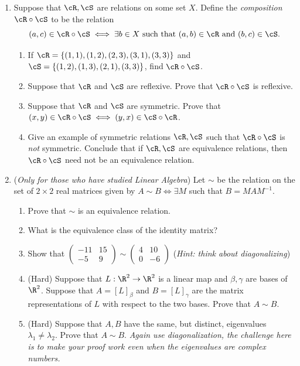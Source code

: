 \begin{enumerate}
	\item Suppose that $\cR,\cS$ are relations on some set $X$. Define the \emph{composition} $\cR\circ \cS$ to be the relation
	\[(a,c)\in \cR\circ \cS\iff \exists b\in X\text{ such that }(a,b)\in \cR\text{ and }(b,c)\in \cS.\]
	\begin{enumerate}
		\item If $\cR=\{(1,1),(1,2),(2,3),(3,1),(3,3)\}$ and $\cS=\{(1,2),(1,3),(2,1),(3,3)\}$, find $\cR\circ \cS$.
		\item Suppose that $\cR$ and $\cS$ are reflexive. Prove that $\cR\circ \cS$ is reflexive.
		\item Suppose that $\cR$ and $\cS$ are symmetric. Prove that $(x,y)\in \cR\circ \cS\iff (y,x)\in \cS\circ \cR$.
		\item Give an example of symmetric relations $\cR,\cS$ such that $\cR\circ \cS$ is \emph{not} symmetric. Conclude that if $\cR,\cS$ are equivalence relations, then $\cR\circ \cS$ need not be an equivalence relation.
	\end{enumerate}

  \item (\emph{Only for those who have studied Linear Algebra}) Let $\sim$ be the relation on the set of $2\times 2$ real matrices given by $A\sim B\iff\exists M$ such that $B=MAM^{-1}$.
  \begin{enumerate}
    \item Prove that $\sim$ is an equivalence relation.
    \item What is the equivalence class of the identity matrix?
    \item Show that $\left(\begin{smallmatrix}
    -11&15\\-5&9
    \end{smallmatrix}\right)\sim \left(\begin{smallmatrix}
    4&10\\0&-6
    \end{smallmatrix}\right)$ (\emph{Hint: think about diagonalizing})
    \item (Hard) Suppose that $L:\R^2\to\R^2$ is a linear map and $\beta,\gamma$ are bases of $\R^2$. Suppose that $A=[L]_\beta$ and $B=[L]_\gamma$ are the matrix representations of $L$ with respect to the two bases. Prove that $A\sim B$.
    \item (Hard) Suppose that $A,B$ have the same, but distinct, eigenvalues $\lambda_1\neq\lambda_2$. Prove that $A\sim B$. \emph{Again use diagonalization, the challenge here is to make your proof work even when the eigenvalues are complex numbers.}
	\end{enumerate}
\end{enumerate}
\newpage


